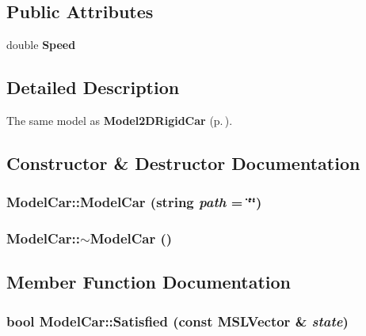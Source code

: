 \subsection*{Public Attributes}
\begin{CompactItemize}
\item 
double {\bf Speed}
\end{CompactItemize}


\subsection{Detailed Description}
The same model as {\bf Model2DRigid\-Car} {\rm (p.\,\pageref{classModel2DRigidCar})}.



\subsection{Constructor \& Destructor Documentation}
\subsubsection{\setlength{\rightskip}{0pt plus 5cm}Model\-Car::Model\-Car (string {\em path} = \char`\"{}\char`\"{})}\label{classModelCar_a0}


\subsubsection{\setlength{\rightskip}{0pt plus 5cm}Model\-Car::$\sim$Model\-Car ()\hspace{0.3cm}{\tt  [inline, virtual]}}\label{classModelCar_a1}




\subsection{Member Function Documentation}
\subsubsection{\setlength{\rightskip}{0pt plus 5cm}bool Model\-Car::Satisfied (const {\bf MSLVector} \& {\em state})\hspace{0.3cm}{\tt  [virtual]}}\label{classModelCar_a3}



